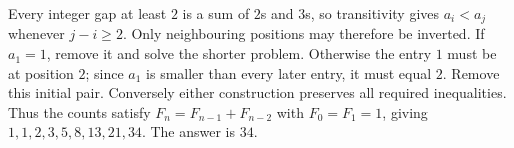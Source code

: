 Every integer gap at least $2$ is a sum of $2$s and $3$s, so transitivity gives $a_i<a_j$ whenever $j-i\ge2$. Only neighbouring positions may therefore be inverted. If $a_1=1$, remove it and solve the shorter problem. Otherwise the entry $1$ must be at position $2$; since $a_1$ is smaller than every later entry, it must equal $2$. Remove this initial pair. Conversely either construction preserves all required inequalities. Thus the counts satisfy $F_n=F_{n-1}+F_{n-2}$ with $F_0=F_1=1$, giving $1,1,2,3,5,8,13,21,34$. The answer is $\boxed{34}$.
